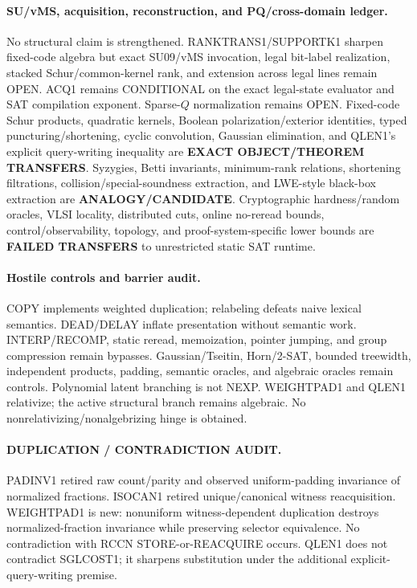 \documentclass[11pt]{article}
\begin{document}
\paragraph{SU/vMS, acquisition, reconstruction, and PQ/cross-domain ledger.}
No structural claim is strengthened. RANKTRANS1/SUPPORTK1 sharpen fixed-code algebra but exact SU09/vMS invocation, legal bit-label realization, stacked Schur/common-kernel rank, and extension across legal lines remain OPEN. ACQ1 remains CONDITIONAL on the exact legal-state evaluator and SAT compilation exponent. Sparse-$Q$ normalization remains OPEN. Fixed-code Schur products, quadratic kernels, Boolean polarization/exterior identities, typed puncturing/shortening, cyclic convolution, Gaussian elimination, and QLEN1's explicit query-writing inequality are \textbf{EXACT OBJECT/THEOREM TRANSFERS}. Syzygies, Betti invariants, minimum-rank relations, shortening filtrations, collision/special-soundness extraction, and LWE-style black-box extraction are \textbf{ANALOGY/CANDIDATE}. Cryptographic hardness/random oracles, VLSI locality, distributed cuts, online no-reread bounds, control/observability, topology, and proof-system-specific lower bounds are \textbf{FAILED TRANSFERS} to unrestricted static SAT runtime.

\paragraph{Hostile controls and barrier audit.}
COPY implements weighted duplication; relabeling defeats naive lexical semantics. DEAD/DELAY inflate presentation without semantic work. INTERP/RECOMP, static reread, memoization, pointer jumping, and group compression remain bypasses. Gaussian/Tseitin, Horn/2-SAT, bounded treewidth, independent products, padding, semantic oracles, and algebraic oracles remain controls. Polynomial latent branching is not NEXP. WEIGHTPAD1 and QLEN1 relativize; the active structural branch remains algebraic. No nonrelativizing/nonalgebrizing hinge is obtained.

\paragraph{DUPLICATION / CONTRADICTION AUDIT.}
PADINV1 retired raw count/parity and observed uniform-padding invariance of normalized fractions. ISOCAN1 retired unique/canonical witness reacquisition. WEIGHTPAD1 is new: nonuniform witness-dependent duplication destroys normalized-fraction invariance while preserving selector equivalence. No contradiction with RCCN STORE-or-REACQUIRE occurs. QLEN1 does not contradict SGLCOST1; it sharpens substitution under the additional explicit-query-writing premise.
\end{document}
